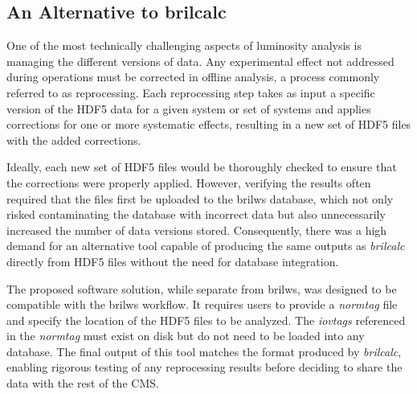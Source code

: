 

\subsection{An Alternative to brilcalc}

One of the most technically challenging aspects of luminosity analysis is managing the different versions of data. Any experimental effect not addressed during operations must be corrected in offline analysis, a process commonly referred to as reprocessing. Each reprocessing step takes as input a specific version of the HDF5 data for a given system or set of systems and applies corrections for one or more systematic effects, resulting in a new set of HDF5 files with the added corrections.

Ideally, each new set of HDF5 files would be thoroughly checked to ensure that the corrections were properly applied. However, verifying the results often required that the files first be uploaded to the brilws database, which not only risked contaminating the database with incorrect data but also unnecessarily increased the number of data versions stored. Consequently, there was a high demand for an alternative tool capable of producing the same outputs as \textit{brilcalc} directly from HDF5 files without the need for database integration.

The proposed software solution, while separate from brilws, was designed to be compatible with the brilws workflow. It requires users to provide a \textit{normtag} file and specify the location of the HDF5 files to be analyzed. The \textit{iovtags} referenced in the \textit{normtag} must exist on disk but do not need to be loaded into any database. The final output of this tool matches the format produced by \textit{brilcalc}, enabling rigorous testing of any reprocessing results before deciding to share the data with the rest of the CMS.

